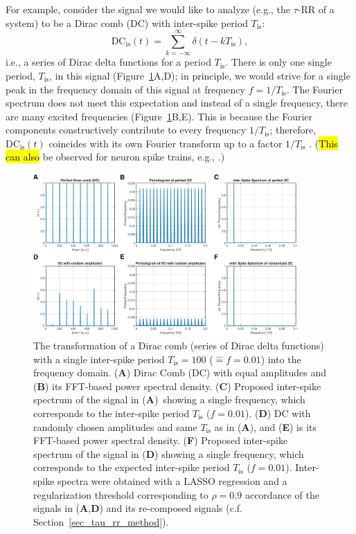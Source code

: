 \documentclass[entropy,article,accept,pdftex,moreauthors]{Definitions/mdpi}
\begin{document}
For example, consider the signal we would like to analyze 
(e.g., the $\tau$-RR of a system) to be a Dirac comb (DC) with inter-spike period $T_\text{is}$: 
\begin{equation}
\text{DC}_{\text{is}}(t) = \sum_{k=-\infty}^{\infty} \delta(t-kT_\text{is}),
\label{eq_dirac_comb}
\end{equation}
i.e., a series of Dirac delta functions for a period $T_\text{is}$. There is only one single period, $T_\text{is}$, in this signal (Figure~\ref{fig_tau_rr_dirac_comb}A,D); 
in principle, we would strive for a single peak in the frequency domain of this signal at frequency $f=1/T_\text{is}$. The Fourier spectrum does not meet this expectation 
and instead of a single frequency, there are many excited frequencies (Figure~\ref{fig_tau_rr_dirac_comb}B,E). This is because the Fourier components constructively contribute
to every frequency $1/T_\text{is}$; therefore, $\text{DC}_{\text{is}}(t)$ coincides with its own Fourier transform up to a factor $1/T_\text{is}$ \cite{Norden1998}. ({\hl{This can also } %
be observed for neuron spike trains, e.g., \cite{Orcioni2020,Biagetti2017}.})

\begin{figure}[H]
 \includegraphics[width=0.9\textwidth]{./figures/fig_tau_rr_dirac_comb}
 \caption{The transformation of a Dirac comb (series of Dirac delta functions) with a single inter-spike period $T_{\text{is}}=100$ ($\widehat{=}f=0.01$) 
 into the frequency domain. 
 (\textbf{A}) Dirac Comb (DC) with equal amplitudes and
 (\textbf{B}) its FFT-based power spectral density.
 (\textbf{C}) Proposed inter-spike spectrum of the signal in (\textbf{A})~showing a single frequency, which corresponds to the inter-spike period $T_{\text{is}}$ ($f=0.01$).
 (\textbf{D}) DC with randomly chosen amplitudes and same $T_{\text{is}}$ as in (\textbf{A}), and
 (\textbf{E}) is its FFT-based power spectral density. 
 (\textbf{F}) Proposed inter-spike spectrum of the signal in (\textbf{D}) showing a single frequency, which corresponds to the expected inter-spike period $T_{\text{is}}$ ($f=0.01$). 
 Inter-spike spectra were obtained with a LASSO regression and a regularization threshold corresponding to $\rho=0.9$ accordance of the signals in (\textbf{A},\textbf{D}) and 
 its re-composed signals (c.f. Section~\ref{sec_tau_rr_method}). 
}
\label{fig_tau_rr_dirac_comb}
\end{figure}
\end{document}
